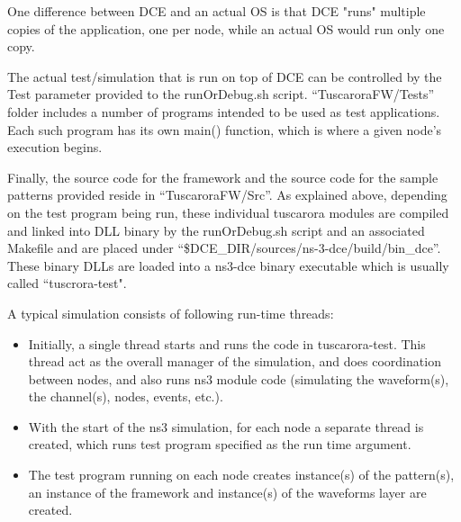 One difference between DCE and an actual OS is that DCE "runs" multiple copies of the application, one per node, while an actual OS would run only one copy. 

The actual test/simulation that is run on top of DCE can be controlled by the Test parameter provided to the runOrDebug.sh script. ``TuscaroraFW/Tests'' folder includes a number of programs intended to be used as test applications. Each such program has its own main() function, which is where a given node's execution begins.



Finally, the source code for the framework and the source code for the sample patterns provided reside in ``TuscaroraFW/Src''. As explained above, depending on the test program being run, these individual tuscarora modules are compiled and linked into DLL binary by the runOrDebug.sh  script and an associated Makefile and are placed under ``\$DCE\_DIR/sources/ns-3-dce/build/bin\_dce''. These binary DLLs are loaded into a ns3-dce binary executable which is usually called ``tuscrora-test".

A typical simulation consists of following run-time threads:
\begin{itemize}
\item Initially, a single thread starts  and runs the code in tuscarora-test. This thread act as the overall manager of the simulation, and does coordination between nodes, and also runs ns3 module code (simulating the waveform(s), the channel(s), nodes, events, etc.). 
\item With the start of the ns3 simulation,  for each node a separate thread is created, which runs test program specified as the run time argument.
\item The test program running on each node creates instance(s) of the pattern(s), an instance of the framework and instance(s) of the waveforms layer are created.
\end{itemize}
